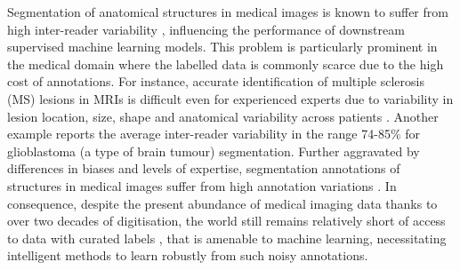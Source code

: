 Segmentation of anatomical structures in medical images is known to suffer from high inter-reader variability \cite{lazarus2006bi,watadani2013interobserver,rosenkrantz2013comparison,menze2014multimodal,joskowicz2019inter}, influencing the performance of downstream supervised machine learning models. This problem is particularly prominent in the medical domain where the labelled data is commonly scarce due to the high cost of annotations. For instance, accurate identification of multiple sclerosis (MS) lesions in MRIs is difficult even for experienced experts due to variability in lesion location, size, shape and anatomical variability across patients \cite{zhang2019multiple}. Another example \cite{menze2014multimodal} reports the average inter-reader variability in the range 74-85\% for glioblastoma (a type of brain tumour) segmentation. Further aggravated by differences in biases and levels of expertise, segmentation annotations of structures in medical images suffer from high annotation variations \cite{kats2019soft}. In consequence, despite the present abundance of medical imaging data thanks to over two decades of digitisation, the world still remains relatively short of access to data with curated labels \cite{harvey2019standardised}, that is amenable to machine learning, necessitating intelligent methods to learn robustly from such noisy annotations.

